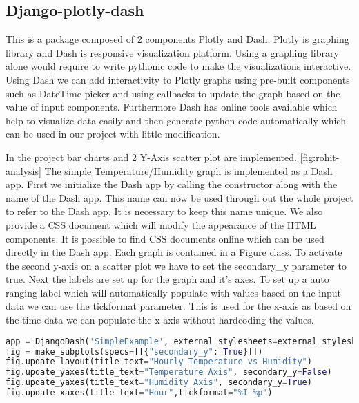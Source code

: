 \subsection{Django-plotly-dash}
This is a package composed of 2 components Plotly and Dash. Plotly is graphing
library and Dash is responsive visualization platform. Using a graphing library
alone would require to write pythonic code to make the visualizations
interactive. Using Dash we can add interactivity to Plotly graphs using pre-built components such as
DateTime picker and using callbacks to update the graph based on the value of input components. Furthermore
Dash has online tools available which help to visualize data easily and then
generate python code automatically which can be used in our project with little
modification.\cite{plotly_chart_studio} 

In the project bar charts and 2 Y-Axis
scatter plot are implemented. \ref{fig:rohit-analysis}
The simple Temperature/Humidity graph is implemented as a Dash app. First we initialize the Dash app
by calling the constructor along with the name of the Dash app. This name can now be used through out the whole
project to refer to the Dash app. It is necessary to keep this name unique. We also provide a CSS document
which will modify the appearance of the HTML components. It is possible to find CSS documents online which 
can be used directly in the Dash app. Each graph is contained in a Figure class. To activate the second y-axis on a scatter plot
we have to set the secondary\_y parameter to true. Next the labels are set up for the graph and it's axes.
To set up a auto ranging label which will automatically populate with values based on the input data we can use the tickformat parameter.
This is used for the x-axis as based on the time data we can populate the x-axis without hardcoding the values. 

\begin{lstlisting}[language={Python}]
app = DjangoDash('SimpleExample', external_stylesheets=external_stylesheets)
fig = make_subplots(specs=[[{"secondary_y": True}]])
fig.update_layout(title_text="Hourly Temperature vs Humidity")
fig.update_yaxes(title_text="Temperature Axis", secondary_y=False)
fig.update_yaxes(title_text="Humidity Axis", secondary_y=True)
fig.update_xaxes(title_text="Hour",tickformat="%I %p")
\end{lstlisting}

